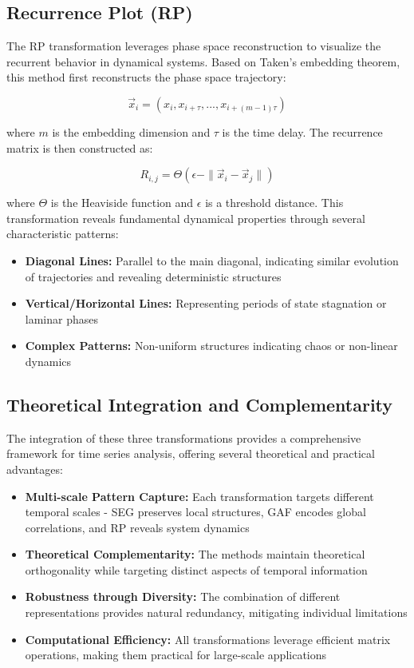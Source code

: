 \subsection{Recurrence Plot (RP)}
The RP transformation leverages phase space reconstruction to visualize the recurrent behavior in dynamical systems. Based on Taken's embedding theorem, this method first reconstructs the phase space trajectory:

\begin{equation}
    \vec{x}_i = (x_i, x_{i+\tau}, ..., x_{i+(m-1)\tau})
\end{equation}

where $m$ is the embedding dimension and $\tau$ is the time delay. The recurrence matrix is then constructed as:

\begin{equation}
    R_{i,j} = \Theta(\epsilon - \|\vec{x}_i - \vec{x}_j\|)
\end{equation}

where $\Theta$ is the Heaviside function and $\epsilon$ is a threshold distance. This transformation reveals fundamental dynamical properties through several characteristic patterns:

\begin{itemize}
    \item \textbf{Diagonal Lines:} Parallel to the main diagonal, indicating similar evolution of trajectories and revealing deterministic structures
    \item \textbf{Vertical/Horizontal Lines:} Representing periods of state stagnation or laminar phases
    \item \textbf{Complex Patterns:} Non-uniform structures indicating chaos or non-linear dynamics
\end{itemize}

\subsection{Theoretical Integration and Complementarity}
The integration of these three transformations provides a comprehensive framework for time series analysis, offering several theoretical and practical advantages:

\begin{itemize}
    \item \textbf{Multi-scale Pattern Capture:} Each transformation targets different temporal scales - SEG preserves local structures, GAF encodes global correlations, and RP reveals system dynamics
    \item \textbf{Theoretical Complementarity:} The methods maintain theoretical orthogonality while targeting distinct aspects of temporal information
    \item \textbf{Robustness through Diversity:} The combination of different representations provides natural redundancy, mitigating individual limitations
    \item \textbf{Computational Efficiency:} All transformations leverage efficient matrix operations, making them practical for large-scale applications
\end{itemize}

